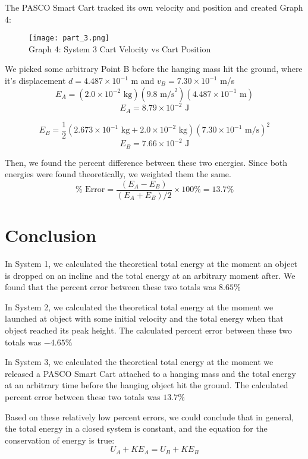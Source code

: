 \documentclass[fleqn]{article}
\begin{document}
The PASCO Smart Cart tracked its own velocity and position and created Graph 4:


\begin{figure}[H]
	\centering
	\texttt{[image: part\_3.png]}
	\\Graph 4: System 3 Cart Velocity vs Cart Position
\end{figure}

We picked some arbitrary Point B before the hanging mass hit the ground, where it's displacement $d=4.487 \times 10^{-1}$ m and $v_B=7.30 \times 10^{-1}$ m/s
\[ E_A = \left(2.0 \times 10^{-2} \text{ kg}\right) \left( 9.8 \text{ m/s}^2  \right) \left( 4.487 \times 10^{-1} \text{ m}  \right)
\]
\[E_A = 8.79 \times 10^{-2} \text{ J}\]

\[ E_B = \frac{1}{2} \left(2.673 \times 10^{-1} \text{ kg}  +
	2.0 \times 10^{-2} \text{ kg}
	\right)
	\left( 7.30 \times 10^{-1} \text{ m/s}  \right)^2
\]
\[ E_B=7.66 \times 10^{-2} \text{ J}  \]

Then, we found the percent difference between these two energies. Since both energies were found theoretically, we weighted them the same.
\[ \% \text{ Error}  = \frac{(E_A - E_B)}{(E_A+E_B)/2} \times 100\%
	=13.7 \%
\]

\section*{Conclusion}
In System 1, we calculated the theoretical total energy at the moment an object is dropped on an incline and the total energy at an arbitrary moment after. We found that the percent error between these two totals was $8.65\%$

In System 2, we calculated the theoretical total energy at the moment we launched at object with some initial velocity and the total energy when that object reached its peak height. The calculated percent error between these two totals was $-4.65\%$

In System 3, we calculated the theoretical total energy at the moment we released a PASCO Smart Cart attached to a hanging mass and the total energy at an arbitrary time before the hanging object hit the ground. The calculated percent error between these two totals was $13.7\%$

Based on these relatively low percent errors, we could conclude that in general, the total energy in a closed system is constant, and the equation for the conservation of energy is true:
\[ U_A + KE_A = U_B + KE_B \]
\end{document}
